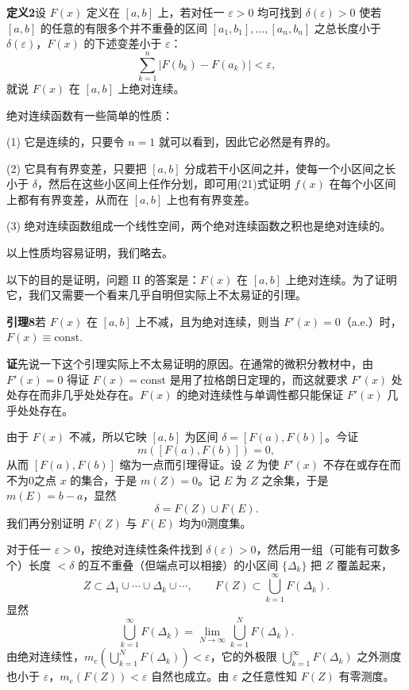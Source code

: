 \noindent\textbf{定义2}\quad 设 $F(x)$ 定义在 $[a,b]$ 上，若对任一 $\varepsilon>0$ 均可找到 $\delta(\varepsilon)>0$ 使若 $[a,b]$ 的任意的有限多个并不重叠的区间 $[a_1,b_1],\ldots,[a_n,b_n]$ 之总长度小于 $\delta(\varepsilon)$，$F(x)$ 的下述变差小于 $\varepsilon$：
\begin{equation}
 \sum_{k=1}^n|F(b_k)-F(a_k)|<\varepsilon,
 \tag{21}
\end{equation}
就说 $F(x)$ 在 $[a,b]$ 上绝对连续。

绝对连续函数有一些简单的性质：

(1) 它是连续的，只要令 $n=1$ 就可以看到，因此它必然是有界的。

(2) 它具有有界变差，只要把 $[a,b]$ 分成若干小区间之并，使每一个小区间之长小于 $\delta$，然后在这些小区间上任作分划，即可用(21)式证明 $f(x)$ 在每个小区间上都有有界变差，从而在 $[a,b]$ 上也有有界变差。

(3) 绝对连续函数组成一个线性空间，两个绝对连续函数之积也是绝对连续的。

以上性质均容易证明，我们略去。

以下的目的是证明，问题 II 的答案是：$F(x)$ 在 $[a,b]$ 上绝对连续。为了证明它，我们又需要一个看来几乎自明但实际上不太易证的引理。

\noindent\textbf{引理8}\quad 若 $F(x)$ 在 $[a,b]$ 上不减，且为绝对连续，则当 $F'(x)=0$（a.e.）时，$F(x)\equiv\text{const}.$

\noindent\textbf{证}\quad 先说一下这个引理实际上不太易证明的原因。在通常的微积分教材中，由 $F'(x)=0$ 得证 $F(x)=\text{const}$ 是用了拉格朗日定理的，而这就要求 $F'(x)$ 处处存在而非几乎处处存在。$F(x)$ 的绝对连续性与单调性都只能保证 $F'(x)$ 几乎处处存在。

由于 $F(x)$ 不减，所以它映 $[a,b]$ 为区间 $\delta=[F(a),F(b)]$。今证\[m([F(a),F(b)])=0,\]从而 $[F(a),F(b)]$ 缩为一点而引理得证。设 $Z$ 为使 $F'(x)$ 不存在或存在而不为0之点 $x$ 的集合，于是 $m(Z)=0$。记 $E$ 为 $Z$ 之余集，于是 $m(E)=b-a$，显然
\[
 \delta=F(Z)\cup F(E).
\]
我们再分别证明 $F(Z)$ 与 $F(E)$ 均为0测度集。

对于任一 $\varepsilon>0$，按绝对连续性条件找到 $\delta(\varepsilon)>0$，然后用一组（可能有可数多个）长度 $<\delta$ 的互不重叠（但端点可以相接）的小区间 $\{\Delta_k\}$ 把 $Z$ 覆盖起来，
\[
 Z\subset\Delta_1\cup\cdots\cup\Delta_k\cup\cdots,
 \qquad F(Z)\subset\bigcup_{k=1}^{\infty}F(\Delta_k).
\]
显然
\[
 \bigcup_{k=1}^{\infty}F(\Delta_k)
 =\lim_{N\to\infty}\bigcup_{k=1}^NF(\Delta_k).
\]
由绝对连续性，$m_e\left(\bigcup_{k=1}^NF(\Delta_k)\right)<\varepsilon$，它的外极限 $\bigcup_{k=1}^{\infty}F(\Delta_k)$ 之外测度也小于 $\varepsilon$，$m_e(F(Z))<\varepsilon$ 自然也成立。由 $\varepsilon$ 之任意性知 $F(Z)$ 有零测度。

